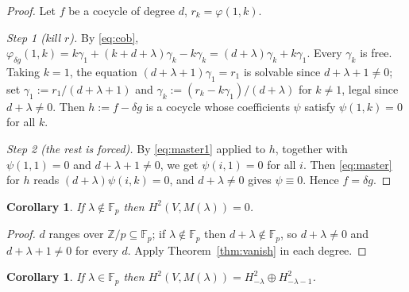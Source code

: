 \documentclass[11pt,reqno]{amsart}
\theoremstyle{plain}
\newtheorem{corollary}[theorem]{Corollary}
\theoremstyle{definition}
\newcommand{\Ht}{H^2}
\newcommand{\Fp}{\mathbb{F}_p}
\newcommand{\Zp}{\mathbb{Z}/p}
\begin{document}
\begin{proof}
Let $f$ be a cocycle of degree $d$, $r_k=\varphi(1,k)$.

\emph{Step 1 (kill $r$).} By \eqref{eq:cob},
$\varphi_{\delta g}(1,k)=k\gamma_1+(k+d+\lambda)\gamma_k-k\gamma_k
=(d+\lambda)\gamma_k+k\gamma_1$. Every $\gamma_k$ is free. Taking $k=1$, the equation
$(d+\lambda+1)\gamma_1=r_1$ is solvable since $d+\lambda+1\ne0$; set
$\gamma_1:=r_1/(d+\lambda+1)$ and $\gamma_k:=(r_k-k\gamma_1)/(d+\lambda)$ for $k\ne1$, legal
since $d+\lambda\ne0$. Then $h:=f-\delta g$ is a cocycle whose coefficients $\psi$ satisfy
$\psi(1,k)=0$ for all $k$.

\emph{Step 2 (the rest is forced).} By \eqref{eq:master1} applied to $h$, together with
$\psi(1,1)=0$ and $d+\lambda+1\ne0$, we get $\psi(i,1)=0$ for all $i$. Then
\eqref{eq:master} for $h$ reads $(d+\lambda)\psi(i,k)=0$, and $d+\lambda\ne0$ gives
$\psi\equiv0$. Hence $f=\delta g$.
\end{proof}

\begin{corollary}\label{cor:notinFp}
If $\lambda\notin\Fp$ then $\Ht(V,M(\lambda))=0$.
\end{corollary}

\begin{proof}
$d$ ranges over $\Zp\subseteq\Fp$; if $\lambda\notin\Fp$ then $d+\lambda\notin\Fp$, so
$d+\lambda\ne0$ and $d+\lambda+1\ne0$ for every $d$. Apply Theorem~\ref{thm:vanish} in each
degree.
\end{proof}

\begin{corollary}\label{cor:twodegrees}
If $\lambda\in\Fp$ then $\Ht(V,M(\lambda))=\Ht_{-\lambda}\oplus\Ht_{-\lambda-1}$.
\end{corollary}
\end{document}
